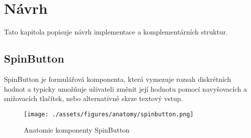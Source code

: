 \chapter{Návrh}

Tato kapitola popisuje návrh implementace a komplementárních struktur.

\section{SpinButton}

SpinButton je formulářová komponenta, která vymezuje rozsah diskrétních hodnot a typicky umožňuje uživateli změnit její hodnotu pomocí navyšovacích a snižovacích tlačítek, nebo alternativně skrze textový vstup.

\begin{figure}[h]
    \centering
    \texttt{[image: ./assets/figures/anatomy/spinbutton.png]}
    \captionsetup{justification=centering}
    \caption{Anatomie komponenty SpinButton}
\end{figure}

